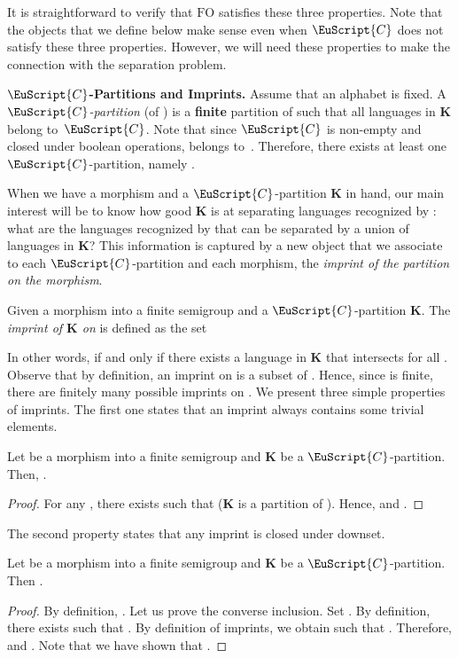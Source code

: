 \documentclass{CSML}
\newcommand\Cs{\ensuremath{\EuScript{C}}\xspace}
\newcommand\Kb{\ensuremath{\mathbf{K}}\xspace}
\newcommand{\fo}{\ensuremath{\text{FO}}\xspace}
\theoremstyle{plain}
\begin{document}
It is straightforward to verify that \fo satisfies these three
properties. Note that the objects that we define below make sense even
when \Cs does not satisfy  these three properties. However, we will
need these properties to make the connection with the separation problem.

\medskip
\noindent
{\bf \Cs-Partitions and Imprints.} Assume that an alphabet  is
fixed. A \emph{\Cs-partition} (of ) is a {\bf finite} partition
 of  such that all languages  in \Kb
belong to~\Cs. Note that since \Cs is non-empty and closed under
boolean operations,  belongs to~. Therefore, there exists at least
one \Cs-partition, namely .

When we have a morphism  and a
\Cs-partition \Kb in hand, our main interest will be to know how good
\Kb is at separating languages recognized by : what are the
languages recognized by  that can be separated by a union of
languages in \Kb ? This information is captured by a new object that
we associate to each \Cs-partition and each morphism, the
\emph{imprint of the partition on the morphism}.

Given a morphism  into a finite semigroup
 and a \Cs-partition \Kb. The \emph{imprint of \Kb on } is
defined as the set

In other words,  if and only if there exists a
language in \Kb that intersects  for all .
Observe that by definition, an imprint on  is a subset of
. Hence, since  is finite, there are finitely many possible
imprints on . We present three simple properties of imprints. The first one states that an imprint always
contains some trivial elements.

\begin{fact}
  \label{fct:trivial}
  Let  be a morphism into a finite semigroup
   and \Kb be a \Cs-partition. Then, .
\end{fact}

\begin{proof}
  For any , there exists  such that  (\Kb
  is a partition of ). Hence, 
  and .
\end{proof}

The second property states that any imprint is closed under downset.

\begin{fact}
  \label{fct:downclos}
  Let  be a morphism into a finite semigroup
   and \Kb be a \Cs-partition. Then .
\end{fact}

\begin{proof}
  By definition, . Let us prove the converse inclusion. Set . By definition, there exists  such that . By definition of
  imprints, we obtain  such that .
  Therefore,  and . Note that we have shown that .
\end{proof}
\end{document}

